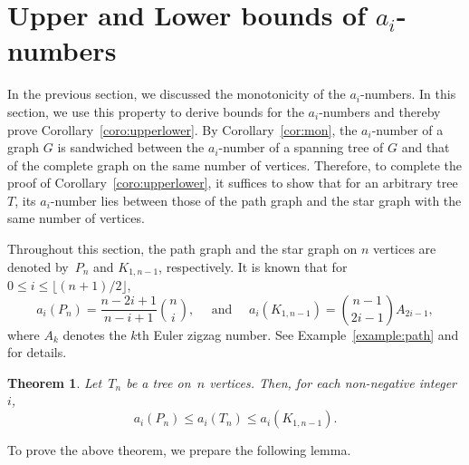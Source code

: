 \documentclass[10pt]{amsart}
\theoremstyle{plain}
\newtheorem{theorem}{Theorem}[section]
\numberwithin{equation}{section}
\theoremstyle{definition}
\begin{document}
\section{Upper and Lower bounds of $a_i$-numbers} \label{sec:bounds}

In the previous section, we discussed the monotonicity of the $a_i$-numbers. 
In this section, we use this property to derive bounds for the $a_i$-numbers and thereby prove Corollary~\ref{coro:upperlower}. 
By Corollary~\ref{cor:mon}, the $a_i$-number of a graph $G$ is sandwiched between the $a_i$-number of a spanning tree of $G$ and that of the complete graph on the same number of vertices. 
Therefore, to complete the proof of Corollary~\ref{coro:upperlower}, it suffices to show that for an arbitrary tree $T$, its $a_i$-number lies between those of the path graph and the star graph with the same number of vertices.

Throughout this section, the path graph and the star graph on $n$ vertices are denoted by~$P_{n}$ and  $K_{1,n-1}$, respectively.
It is known that for $0\le i\le \lfloor (n+1)/2\rfloor$,
$$
    a_i(P_n)=\frac{n-2i+1}{n-i+1}\binom{n}{i}, \quad \text{ and } \quad  a_i(K_{1,n-1})=\binom{n-1}{2i-1}A_{2i-1},
$$
where $A_k$ denotes the $k$th Euler zigzag number.
See Example~\ref{example:path} and \cite{Choi-Park2015} for details.


\begin{theorem} \label{thm:bounds_a_i_numbers}
    Let~$T_n$ be a tree on~$n$ vertices.
    Then, for each non-negative integer~$i$,
    \begin{equation}\label{eq:treeupperlower}
        a_i(P_{n})\le a_i(T_n) \le a_i(K_{1,n-1}).
    \end{equation}
\end{theorem}

To prove the above theorem, we prepare the following lemma.
\end{document}
